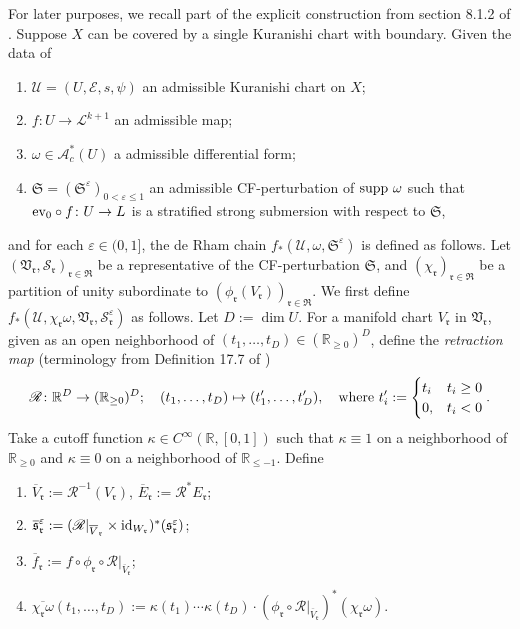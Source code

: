 \documentclass[10pt]{amsart}
\numberwithin{equation}{section}
\theoremstyle{plain}
\theoremstyle{definition}
\theoremstyle{remark}
\numberwithin{equation}{section}
\newcommand{\R}{\mathbb{R}}
\newcommand{\id}{\textup{id}}
\newcommand{\ev}{\textup{ev}}
\newcommand{\ol}[1]{\overline{#1}}
\newcommand{\mf}[1]{\mathfrak{#1}}
\newcommand{\ms}[1]{\mathscr{#1}}
\begin{document}
{For later purposes, we recall part of the explicit construction from section 8.1.2 of \cite{Irie2}.
Suppose $X$ can be covered by a single Kuranishi chart with boundary. Given the data of
\begin{enumerate}
	\item $\ms{U}=(U,\ms{E},s,\psi)$ an admissible Kuranishi chart on $X$;
	\item $f\colon U\to \ms{L}^{k+1}$ an admissible map;
	\item $\omega\in \ms{A}_c^*(U)$ a admissible differential form;
	\item $\mf{S}=(\mf{S}^\varepsilon)_{0<\varepsilon\leq 1}$ an admissible CF-perturbation of $\textup{supp }\omega$ such that $\ev_0\circ f\colon U\to L$ is a stratified strong submersion with respect to $\mf{S}$,
\end{enumerate}
and for each $\varepsilon\in (0,1]$, 
the de Rham chain $f_*(\ms{U},\omega,\mf{S}^\varepsilon)$ is defined as follows.
Let $(\mf{V}_\mf{r}, \ms{S}_\mf{r})_{\mf{r}\in\mf{R}}$ be a representative of the CF-perturbation $\mf{S}$, and $(\chi_\mf{r})_{\mf{r}\in\mf{R}}$ be a partition of unity subordinate to $(\phi_\mf{r}(V_\mf{r}))_{\mf{r}\in\mf{R}}$. 
We first define $f_*(\ms{U},\chi_\mf{r}\omega, \mf{V}_\mf{r}, \ms{S}_\mf{r}^\varepsilon)$ as follows. Let $D:=\dim U$. For a manifold chart $V_\mf{r}$ in $\mf{V}_\mf{r}$, given as an open neighborhood of $(t_1,\dots, t_D)\in (\R_{\geq 0})^D$, define the \emph{retraction map} (terminology from Definition 17.7 of \cite{FOOO20book})
\begin{align*}
	\ms{R}\colon \R^D\to (\R_{\geq 0})^D;\quad (t_1,\dots, t_D)\mapsto (t_1',\dots, t_D'),\quad \textup{where } t_i':= \begin{cases}
		t_i & t_i\geq 0\\
		0, & t_i<0
	\end{cases}.
\end{align*}
Take a cutoff function $\kappa\in C^\infty(\R,[0,1])$ such that $\kappa\equiv 1$ on a neighborhood of $\R_{\geq 0}$ and $\kappa \equiv 0$ on a neighborhood of $\R_{\leq -1}$. Define 
\begin{enumerate}
	\item $\ol{V}_{\mf{r}}:= \ms{R}^{-1}(V_\mf{r})$, $\ol{E}_\mf{r}:=\ms{R}^*E_\mf{r}$;
	\item $\ol{\mf{s}}_\mf{r}^\varepsilon:= (\ms{R}|_{\ol{V}_\mf{r}}\times \id_{W_\mf{r}})^*(\mf{s}_\mf{r}^\varepsilon)$;
	\item $\ol{f}_\mf{r}:= f\circ \phi_\mf{r}\circ \ms{R}|_{\ol{V}_\mf{r}}$;
	\item $\ol{\chi_\mf{r}\omega}(t_1,\dots, t_D):= \kappa(t_1)\cdots \kappa(t_D)\cdot  (\phi_\mf{r}\circ \ms{R}|_{\ol{V}_\mf{r}})^*(\chi_\mf{r}\omega)$.

\end{enumerate}}
\end{document}
